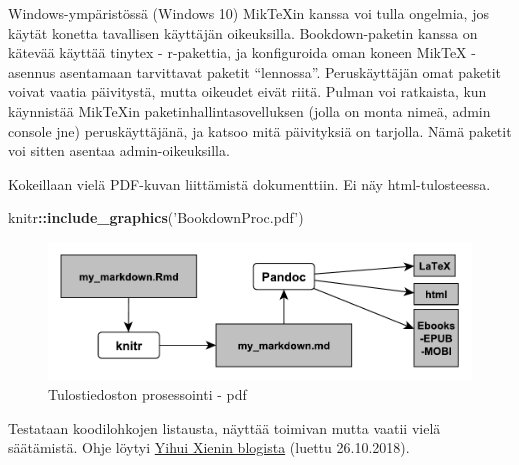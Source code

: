 \documentclass[
  finnish,
]{book}
\newenvironment{Shaded}{\begin{snugshade}}{\end{snugshade}}
\newcommand{\KeywordTok}[1]{\textcolor[rgb]{0.13,0.29,0.53}{\textbf{#1}}}
\newcommand{\NormalTok}[1]{#1}
\newcommand{\OperatorTok}[1]{\textcolor[rgb]{0.81,0.36,0.00}{\textbf{#1}}}
\newcommand{\StringTok}[1]{\textcolor[rgb]{0.31,0.60,0.02}{#1}}
\begin{document}
Windows-ympäristössä (Windows 10) MikTeXin kanssa voi tulla ongelmia, jos käytät konetta tavallisen käyttäjän oikeuksilla. Bookdown-paketin kanssa on kätevää käyttää tinytex - r-pakettia, ja konfiguroida oman koneen MikTeX - asennus asentamaan tarvittavat paketit ``lennossa''. Peruskäyttäjän omat paketit voivat vaatia päivitystä, mutta oikeudet eivät riitä. Pulman voi ratkaista, kun käynnistää MikTeXin paketinhallintasovelluksen (jolla on monta nimeä, admin console jne) peruskäyttäjänä, ja katsoo mitä päivityksiä on tarjolla. Nämä paketit voi sitten asentaa admin-oikeuksilla.

Kokeillaan vielä PDF-kuvan liittämistä dokumenttiin. Ei näy html-tulosteessa.

\begin{Shaded}
\begin{Highlighting}[]
\NormalTok{knitr}\OperatorTok{::}\KeywordTok{include_graphics}\NormalTok{(}\StringTok{'BookdownProc.pdf'}\NormalTok{)}
\end{Highlighting}
\end{Shaded}

\begin{figure}

{\centering \includegraphics[width=0.5\linewidth]{BookdownProc} 

}

\caption{Tulostiedoston prosessointi - pdf}\label{fig:bdprocess2}
\end{figure}

Testataan koodilohkojen listausta, näyttää toimivan mutta vaatii vielä säätämistä. Ohje löytyi \href{https://yihui.name/en/2018/09/code-appendix/}{Yihui Xienin blogista} (luettu 26.10.2018).
\end{document}
